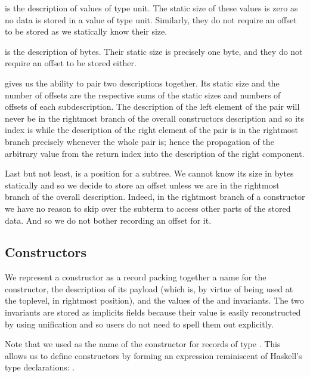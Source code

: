  is the description of values of type unit. The static
size of these values is zero as no data is stored in a value of type unit.
Similarly, they do not require an offset to be stored as we statically
know their size.

 is the description of bytes.
%
Their static size is precisely one byte, and they do not require an
offset to be stored either.

 gives us the ability to pair two descriptions together.
Its static size and the number of offsets are the respective sums of the
static sizes and numbers of offsets of each subdescription.
%
The description of the left element of the pair will never be in the
rightmost branch of the overall constructors description and so its
index is  while the description of the right element
of the pair is in the rightmost branch precisely whenever the whole pair
is; hence the propagation of the  arbitrary value from the
return index into the description of the right component.

Last but not least,  is a position for a subtree.
We cannot know its size in bytes statically and so we decide to store
an offset unless we are in the rightmost branch of the overall description.
%
Indeed, in the rightmost branch of a constructor we have no reason to
skip over the subterm to access other parts of the stored data. And so we
do not bother recording an offset for it.


\subsection{Constructors}

We represent a constructor as a record packing together
a name for the constructor,
the description of its payload (which is, by virtue of
being used at the toplevel, in rightmost position),
and the values of the  and
 invariants.
%
The two invariants are stored as implicits fields
because their value is easily reconstructed by \idris{}
using unification and so users do not need
to spell them out explicitly.


Note that we used \IdrisData{(::)} as the name of the
constructor for records of type .
This allows us to define constructors by forming an
expression reminiscent of Haskell's type declarations:
 \IdrisData{::} .

